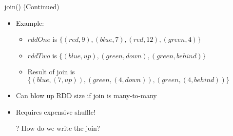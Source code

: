 \documentclass[aspectratio=169]{beamer}
\begin{document}
\begin{frame}{join() (Continued)}

\begin{itemize}
\item Example:
	\begin{itemize}
	\item $rddOne$ is $\{(red, 9), (blue, 7), (red, 12), (green, 4)\}$
	\item $rddTwo$ is $\{(blue, up), (green, down), (green, behind)\}$
	\item Result of join is $\{(blue, (7, up)), (green, (4, down)), (green, (4, behind))\}$
	\end{itemize}
\item Can blow up RDD size if join is many-to-many
\item Requires expensive shuffle!
\item[?] How do we write the join?
\end{itemize}
\end{frame}
\end{document}
